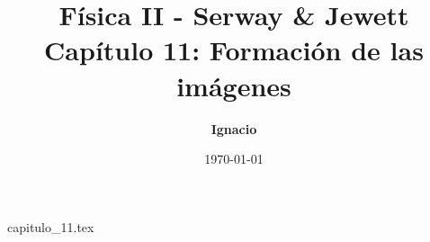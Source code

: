 \documentclass[11pt,spanish,oneside]{report}
\title{\textbf{Física II - Serway \& Jewett} \\ \Large Capítulo 11: Formación de las imágenes}
\author{\textbf{Ignacio}}
\date{\today}
\begin{document}
\maketitle

{capitulo_11.tex}
\end{document}
